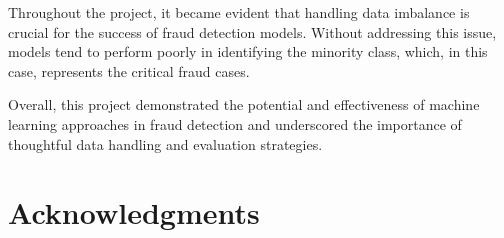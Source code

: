\documentclass[11pt]{article}
\begin{document}
Throughout the project, it became evident that handling data imbalance is crucial for the success of fraud detection models. Without addressing this issue, models tend to perform poorly in identifying the minority class, which, in this case, represents the critical fraud cases. 

Overall, this project demonstrated the potential and effectiveness of machine learning approaches in fraud detection and underscored the importance of thoughtful data handling and evaluation strategies.
 

\section*{Acknowledgments}




\appendix


\end{document}
